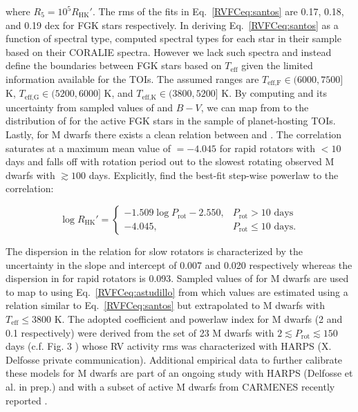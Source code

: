 \noindent where $R_5 = 10^5 R_{\text{HK}}'$.
The rms of the fits in Eq.~\ref{RVFCeq:santos} are 0.17, 0.18, and 0.19 dex for FGK stars respectively.
In deriving Eq.~\ref{RVFCeq:santos} as a function of spectral type, \cite{santos00} computed
spectral types for each star in their sample based on their CORALIE spectra. However we lack such spectra and
instead define the boundaries between
FGK stars based on $T_{\text{eff}}$ given the limited information available for the TOIs. The assumed ranges
are $T_{\text{eff,F}} \in (6000,7500]$ K, $T_{\text{eff,G}} \in (5200,6000]$ K, and $T_{\text{eff,K}} \in (3800,5200]$ K.
      By computing \Rhk{} and its uncertainty from sampled values of \prot{} and $B-V$, we can map from \Rhk{} to the
      distribution of \sigact{} for the active FGK stars in the sample of planet-hosting TOIs. \\

Lastly, for M dwarfs there exists a clean relation between \Rhk{} and \prot{} \citep{astudillodefru17b}.
The correlation saturates at a maximum mean value of \Rhk{} $=-4.045$ for rapid rotators with \prot{} $< 10$
days and falls off with rotation period out to the slowest rotating observed M dwarfs with \prot{} $\gtrsim 100$
days. Explicitly, \cite{astudillodefru17b} find the best-fit step-wise powerlaw to the correlation:

\begin{equation}
  \log{R_{\text{HK}}'}  =
  \begin{cases}
    -1.509 \log{P_{\text{rot}}} -2.550, & P_{\text{rot}} > 10 \text{ days} \\
    -4.045, & P_{\text{rot}} \leq 10 \text{ days}.
  \end{cases} \label{RVFCeq:astudillo}
\end{equation}

\noindent The dispersion in the relation for slow rotators is characterized by the uncertainty in the slope and
intercept of 0.007 and 0.020 respectively whereas the dispersion in \Rhk{} for rapid rotators is 0.093. Sampled
values of \prot{} for M dwarfs are used to map to \Rhk{} using Eq.~\ref{RVFCeq:astudillo} from which \sigact{} values
are estimated using a relation similar to Eq.~\ref{RVFCeq:santos} but extrapolated to M dwarfs 
with $T_{\text{eff}} \leq 3800$ K. The adopted coefficient and powerlaw index for M dwarfs (2 \mps{} and 0.1
respectively) were derived from the set of 23
M dwarfs with $2 \lesssim P_{\text{rot}} \lesssim 150$ days (c.f. Fig. 3 \citealt{cloutier18a})
whose RV activity rms was characterized with HARPS (X. Delfosse private communication).
Additional empirical data to further
calibrate these models for M dwarfs are part of an ongoing study with HARPS
(Delfosse et al. in prep.) and with a subset of active M dwarfs from CARMENES recently reported \citep{tal-or18}. \\


